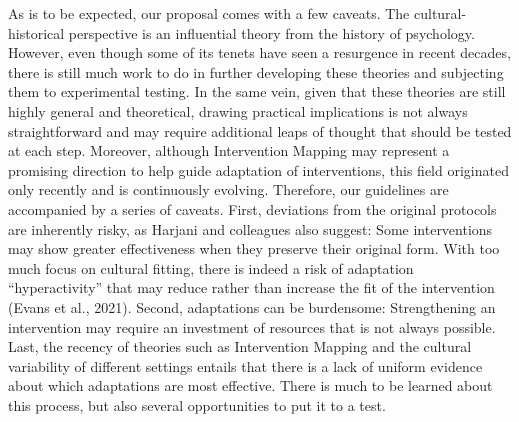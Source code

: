 \documentclass[authordate, reflection, issue]{jote-new-article}
\begin{document}
	As is to be expected, our proposal comes with a few caveats. The cultural-historical perspective is an influential theory from the history of psychology. However, even though some of its tenets have seen a resurgence in recent decades, there is still much work to do in further developing these theories and subjecting them to experimental testing. In the same vein, given that these theories are still highly general and theoretical, drawing practical implications is not always straightforward and may require additional leaps of thought that should be tested at each step. Moreover, although Intervention Mapping may represent a promising direction to help guide adaptation of interventions, this field originated only recently and is continuously evolving. Therefore, our guidelines are accompanied by a series of caveats. First, deviations from the original protocols are inherently risky, as Harjani and colleagues also suggest: Some interventions may show greater effectiveness when they preserve their original form. With too much focus on cultural fitting, there is indeed a risk of adaptation “hyperactivity” that may reduce rather than increase the fit of the intervention (Evans et al., 2021). Second, adaptations can be burdensome: Strengthening an intervention may require an investment of resources that is not always possible. Last, the recency of theories such as Intervention Mapping and the cultural variability of different settings entails that there is a lack of uniform evidence about which adaptations are most effective. There is much to be learned about this process, but also several opportunities to put it to a test.
\end{document}
